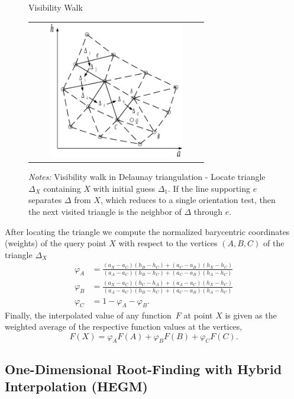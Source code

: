 \documentclass[a4paper,12pt]{article}
\begin{document}
\begin{figure}[htb]
	\caption{Visibility Walk}
	\label{fig:visibility_walk}
	\centering
	\begin{tabular}{c}
	\includegraphics[height=6.0cm, width=7.5cm]{Abbildungen/visibility_walk_2.eps}  \\
	\end{tabular}
	\caption*{\footnotesize{\emph{Notes:} Visibility walk in Delaunay triangulation - Locate triangle $\Delta_{X}$ containing $X$ with initial guess $\Delta_{1}$. If the line supporting $e$ separates $\Delta$ from $X$, which reduces to a single orientation test, then the next visited triangle is the neighbor of $\Delta$ through $e$.}}
\end{figure}

After locating the triangle we compute the normalized barycentric coordinates (weights) of the query point $X$ with respect to the vertices $(A,B,C)$ of the triangle $\Delta_{X}$
\begin{align*}
	\varphi_{A}  &  = \frac{\left(a_{X} - a_{C}\right) \left(h_{B} - h_{C}\right) + \left(a_{C} - a_{B}\right) \left(h_{X} - h_{C}\right)} {\left(a_{A} - a_{C}\right) \left(h_{B} - h_{C}\right) +\left(a_{C} - a_{B}\right) \left(h_{A} - h_{C}\right)}  \\
	\varphi_{B}  &  = \frac{\left(a_{X} - a_{C}\right) \left(h_{C} - h_{A}\right) + \left(a_{A} - a_{C}\right) \left(h_{X} - h_{C}\right)} {\left(a_{A} - a_{C}\right) \left(h_{B} - h_{C}\right) +\left(a_{C} - a_{B}\right) \left(h_{A} - h_{C}\right)}  \\
	\varphi_{C}  &  = 1 - \varphi_{A} - \varphi_{B}.
\end{align*}
Finally, the interpolated value of any function~$F$ at point $X$ is given as the weighted average of the respective function values at the vertices,
\[
	F\left(X\right) = \varphi_{A} F(A) + \varphi_{B} F(B) + \varphi_{C} F(C).
\]

\subsection{One-Dimensional Root-Finding with Hybrid Interpolation (HEGM)}
\end{document}
